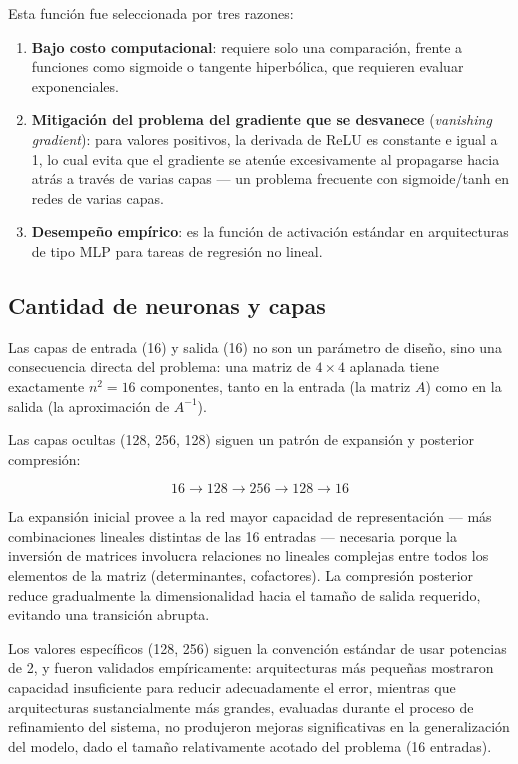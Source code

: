 \documentclass[12pt,a4paper]{article}
\begin{document}
Esta función fue seleccionada por tres razones:

\begin{enumerate}
    \item \textbf{Bajo costo computacional}: requiere solo una comparación, frente a funciones como sigmoide o tangente hiperbólica, que requieren evaluar exponenciales.
    \item \textbf{Mitigación del problema del gradiente que se desvanece} (\textit{vanishing gradient}): para valores positivos, la derivada de ReLU es constante e igual a 1, lo cual evita que el gradiente se atenúe excesivamente al propagarse hacia atrás a través de varias capas --- un problema frecuente con sigmoide/tanh en redes de varias capas.
    \item \textbf{Desempeño empírico}: es la función de activación estándar en arquitecturas de tipo MLP para tareas de regresión no lineal.
\end{enumerate}

\subsection{Cantidad de neuronas y capas}

Las capas de entrada (16) y salida (16) no son un parámetro de diseño, sino una consecuencia directa del problema: una matriz de $4\times4$ aplanada tiene exactamente $n^2 = 16$ componentes, tanto en la entrada (la matriz $A$) como en la salida (la aproximación de $A^{-1}$).

Las capas ocultas (128, 256, 128) siguen un patrón de expansión y posterior compresión:

\[
    16 \to 128 \to 256 \to 128 \to 16
\]

La expansión inicial provee a la red mayor capacidad de representación --- más combinaciones lineales distintas de las 16 entradas --- necesaria porque la inversión de matrices involucra relaciones no lineales complejas entre todos los elementos de la matriz (determinantes, cofactores). La compresión posterior reduce gradualmente la dimensionalidad hacia el tamaño de salida requerido, evitando una transición abrupta.

Los valores específicos (128, 256) siguen la convención estándar de usar potencias de 2, y fueron validados empíricamente: arquitecturas más pequeñas mostraron capacidad insuficiente para reducir adecuadamente el error, mientras que arquitecturas sustancialmente más grandes, evaluadas durante el proceso de refinamiento del sistema, no produjeron mejoras significativas en la generalización del modelo, dado el tamaño relativamente acotado del problema (16 entradas).
\end{document}
